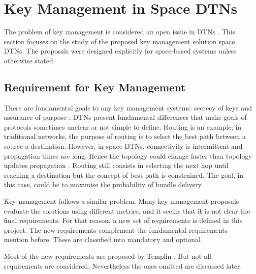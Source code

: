 \section{Key Management in Space DTNs}
\label{sec:survey}


The problem of key management is considered an open issue in DTNs \cite{menesidou2016automated}. This section focuses on the study of the proposed key management solution space DTNs.  The proposals were designed explicitly for space-based systems unless otherwise stated.



\subsection{Requirement for Key Management}

There are fundamental goals to any key management systems: secrecy of keys and assurance of purpose \cite{martineveryday}. DTNs present fundamental differences that make goals of protocols sometimes unclear or not simple to define. Routing is an example; in traditional networks, the purpose of routing is to select the best path between a source a destination. However, in space DTNs, connectivity is intermittent and propagation times are long. Hence the topology could change faster than topology updates propagation \cite{araniti2015contact}. Routing still consists in selecting the next hop until reaching a destination but the concept of best path is constrained.  The goal, in this case, could be to maximise the probability of bundle delivery.

Key management follows a similar problem. Many key management proposals evaluate the solutions using different metrics, and it seems that it is not clear the final requirements. For that reason, a new set of requirements is defined in this project. The new requirements complement the fundamental requirements mention before. These are classified into mandatory and optional. 

  
Most of the new requirements are proposed by Templin \cite{templin-dtnskmreq-00}. But not all requirements are considered. Nevertheless the ones omitted are discussed later. 



